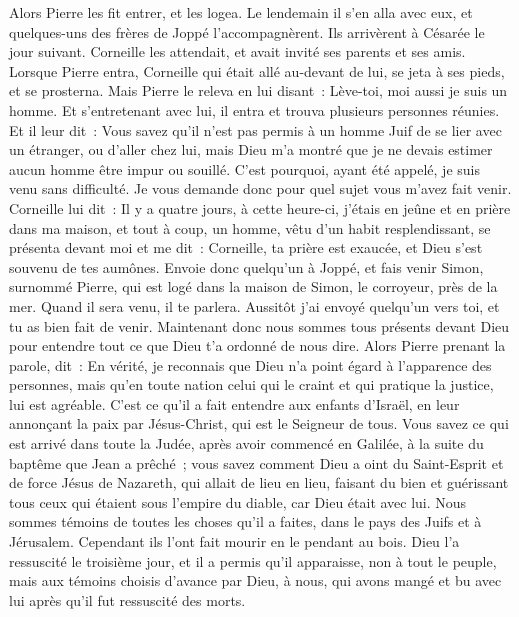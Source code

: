 \begin{multicols}{2}
Alors Pierre les fit entrer, et les logea. Le lendemain il s'en alla avec eux, et quelques-uns des frères de Joppé l'accompagnèrent.
Ils arrivèrent à Césarée le jour suivant. Corneille les attendait, et avait invité ses parents et ses amis.
Lorsque Pierre entra, Corneille qui était allé au-devant de lui, se jeta à ses pieds, et se prosterna.
Mais Pierre le releva en lui disant~: Lève-toi, moi aussi je suis un homme.
Et s'entretenant avec lui, il entra et trouva plusieurs personnes réunies.
Et il leur dit~: Vous savez qu'il n'est pas permis à un homme Juif de se lier avec un étranger, ou d'aller chez lui, mais Dieu m'a montré que je ne devais estimer aucun homme être impur ou souillé.
C'est pourquoi, ayant été appelé, je suis venu sans difficulté. Je vous demande donc pour quel sujet vous m'avez fait venir.
Corneille lui dit~: Il y a quatre jours, à cette heure-ci, j'étais en jeûne et en prière dans ma maison, et tout à coup, un homme, vêtu d'un habit resplendissant, se présenta devant moi et me dit~:
Corneille, ta prière est exaucée, et Dieu s'est souvenu de tes aumônes.
Envoie donc quelqu'un à Joppé, et fais venir Simon, surnommé Pierre, qui est logé dans la maison de Simon, le corroyeur, près de la mer. Quand il sera venu, il te parlera.
Aussitôt j'ai envoyé quelqu'un vers toi, et tu as bien fait de venir. Maintenant donc nous sommes tous présents devant Dieu pour entendre tout ce que Dieu t'a ordonné de nous dire.
Alors Pierre prenant la parole, dit~: En vérité, je reconnais que Dieu n'a point égard à l'apparence des personnes,
mais qu'en toute nation celui qui le craint et qui pratique la justice, lui est agréable.
C'est ce qu'il a fait entendre aux enfants d'Israël, en leur annonçant la paix par Jésus-Christ, qui est le Seigneur de tous.
Vous savez ce qui est arrivé dans toute la Judée, après avoir commencé en Galilée, à la suite du baptême que Jean a prêché~;
vous savez comment Dieu a oint du Saint-Esprit et de force Jésus de Nazareth, qui allait de lieu en lieu, faisant du bien et guérissant tous ceux qui étaient sous l'empire du diable, car Dieu était avec lui.
Nous sommes témoins de toutes les choses qu'il a faites, dans le pays des Juifs et à Jérusalem. Cependant ils l'ont fait mourir en le pendant au bois.
Dieu l'a ressuscité le troisième jour, et il a permis qu'il apparaisse,
non à tout le peuple, mais aux témoins choisis d'avance par Dieu, à nous, qui avons mangé et bu avec lui après qu'il fut ressuscité des morts.

\end{multicols}

